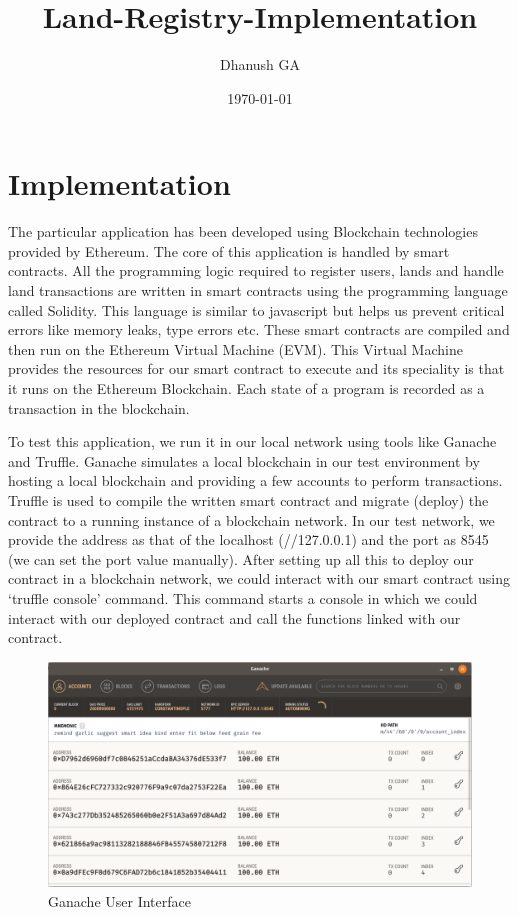 \documentclass[11pt]{article}
\author{Dhanush GA}
\date{\today}
\title{Land-Registry-Implementation}
\begin{document}
\maketitle
\tableofcontents


\section{Implementation}
\label{sec:org872a95f}
The particular application has been developed using Blockchain technologies provided by Ethereum. The core of this application is handled by smart contracts. All the programming logic required to register users, lands and handle land transactions are written in smart contracts using the programming language called Solidity. This language is similar to javascript but helps us prevent critical errors like memory leaks, type errors etc. These smart contracts are compiled and then run on the Ethereum Virtual Machine (EVM). This Virtual Machine provides the resources for our smart contract to execute and its speciality is that it runs on the Ethereum Blockchain. Each state of a program is recorded as a transaction in the blockchain. 

To test this application, we run it in our local network using tools like Ganache and Truffle. Ganache simulates a local blockchain in our test environment by hosting a local blockchain and providing a few accounts to perform transactions. Truffle is used to compile the written smart contract and migrate (deploy) the contract to a running instance of a blockchain network. In our test network, we provide the address as that of the localhost (//127.0.0.1) and the port as 8545 (we can set the port value manually). After setting up all this to deploy our contract in a blockchain network, we could interact with our smart contract using ‘truffle console’ command. This command starts a console in which we could interact with our deployed contract and call the functions linked with our contract.

\begin{figure}[htbp]
\centering
\includegraphics[width=.9\linewidth]{./ganache-interface.png}
\caption{Ganache User Interface}
\end{figure}
\end{document}
